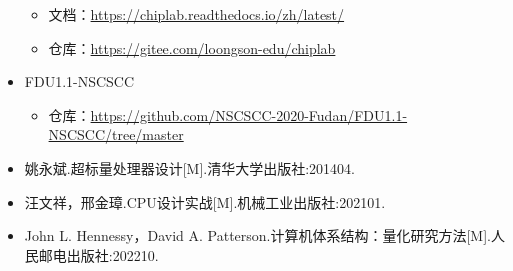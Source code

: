 \documentclass{article}
\begin{document}
\begin{itemize}
          \begin{itemize}
              \item 文档：\url{https://chiplab.readthedocs.io/zh/latest/}
              \item 仓库：\url{https://gitee.com/loongson-edu/chiplab}
          \end{itemize}
    \item FDU1.1-NSCSCC
          \begin{itemize}
              \item 仓库：\url{https://github.com/NSCSCC-2020-Fudan/FDU1.1-NSCSCC/tree/master}
          \end{itemize}
    \item 姚永斌.超标量处理器设计[M].清华大学出版社:201404.
    \item 汪文祥，邢金璋.CPU设计实战[M].机械工业出版社:202101.
    \item John L. Hennessy，David A. Patterson.计算机体系结构：量化研究方法[M].人民邮电出版社:202210.
\end{itemize}
\end{document}
